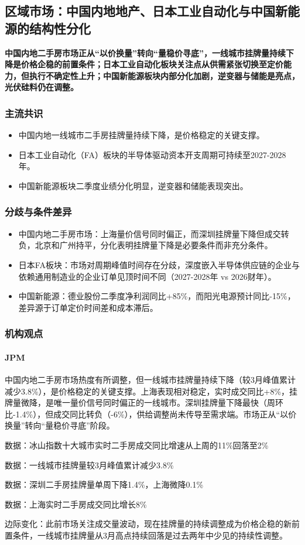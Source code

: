 \documentclass[11pt]{ctexart}
\begin{document}
\subsection{区域市场：中国内地地产、日本工业自动化与中国新能源的结构性分化}
\textbf{中国内地二手房市场正从“以价换量”转向“量稳价寻底”，一线城市挂牌量持续下降是价格企稳的前置条件；日本工业自动化板块关注点从供需紧张切换至定价能力，但执行不确定性上升；中国新能源板块内部分化加剧，逆变器与储能是亮点，光伏硅料仍在调整。}
\subsubsection*{主流共识}
\begin{itemize}
  \item 中国内地一线城市二手房挂牌量持续下降，是价格稳定的关键支撑。
  \item 日本工业自动化（FA）板块的半导体驱动资本开支周期可持续至2027-2028年。
  \item 中国新能源板块二季度业绩分化明显，逆变器和储能表现突出。
\end{itemize}
\subsubsection*{分歧与条件差异}
\begin{itemize}
  \item 中国内地二手房市场：上海量价信号同时偏正，而深圳挂牌量下降但成交转负，北京和广州持平，分化表明挂牌量下降是必要条件而非充分条件。
  \item 日本FA板块：市场对周期峰值时间存在分歧，深度嵌入半导体供应链的企业与依赖通用制造业的企业订单见顶时间不同（2027-2028年 vs 2026财年）。
  \item 中国新能源：德业股份二季度净利润同比+85\%，而阳光电源预计同比-15\%，差异源于订单定价时间差和成本滞后。
\end{itemize}
\subsubsection*{机构观点}
\paragraph{JPM} 中国内地二手房市场热度有所调整，但一线城市挂牌量持续下降（较3月峰值累计减少3.8\%），是价格稳定的关键支撑。上海表现相对稳定，实时成交同比+8\%，挂牌量微降，是唯一量价信号同时偏正的一线城市。深圳挂牌量下降最快（周环比-1.4\%），但成交同比转负（-6\%），供给调整尚未传导至需求端。市场正从“以价换量”转向“量稳价寻底”阶段。
{\small\color{refgray}数据：冰山指数十大城市实时二手房成交同比增速从上周的11\%回落至2\%\par}
{\small\color{refgray}数据：一线城市挂牌量较3月峰值累计减少3.8\%\par}
{\small\color{refgray}数据：深圳二手房挂牌量单周下降1.4\%，上海微降0.1\%\par}
{\small\color{refgray}数据：上海实时二手房成交同比增长8\%\par}
{\small\color{refgray}边际变化：此前市场关注成交量波动，现在挂牌量的持续调整成为价格企稳的新前置条件，一线城市挂牌量从3月高点持续回落是过去两年中少见的持续性调整。\par}
\end{document}
